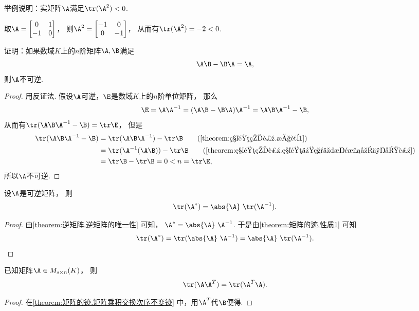 \begin{example}
举例说明：实矩阵\(\A\)满足\(\tr(\A^2)<0\).
\begin{solution}
取\(\A = \begin{bmatrix}
	0 & 1 \\
	-1 & 0
\end{bmatrix}\)，
则\(\A^2 = \begin{bmatrix}
	-1 & 0 \\
	0 & -1
\end{bmatrix}\)，
从而有\(\tr(\A^2) = -2 < 0\).
\end{solution}
\end{example}

\begin{example}
证明：如果数域\(K\)上的\(n\)阶矩阵\(\A,\B\)满足\[
	\A \B - \B \A=\A,
\]
则\(\A\)不可逆.
\begin{proof}
用反证法.
假设\(\A\)可逆，\(\E\)是数域\(K\)上的\(n\)阶单位矩阵，
那么\begin{gather*}
	\E = \A\A^{-1}
	= (\A \B - \B \A)\A^{-1} %
	= \A \B \A^{-1}-\B,
\end{gather*}
从而有\(\tr(\A \B \A^{-1}-\B) = \tr\E\)，
但是\begin{align*}
	\tr(\A \B \A^{-1}-\B)
	&= \tr(\A \B \A^{-1})-\tr\B
		\tag{\cref{theorem:矩阵的迹.性质1}} \\
	&= \tr(\A^{-1}(\A \B))-\tr\B
		\tag{\cref{theorem:矩阵的迹.矩阵乘积交换次序不变迹}} \\
	&= \tr\B-\tr\B
	= 0
	< n = \tr\E,
\end{align*}
所以\(\A\)不可逆.
\end{proof}
\end{example}

\begin{property}
设\(\A\)是可逆矩阵，
则\begin{equation}
	\tr(\A^*) = \abs{\A}~\tr(\A^{-1}).
\end{equation}
\begin{proof}
由\cref{theorem:逆矩阵.逆矩阵的唯一性} 可知，
\(\A^* = \abs{\A}~\A^{-1}\).
于是由\cref{theorem:矩阵的迹.性质1} 可知\[
	\tr(\A^*) = \tr(\abs{\A}~\A^{-1}) = \abs{\A}~\tr(\A^{-1}).
	\qedhere
\]
\end{proof}
\end{property}

\begin{property}
已知矩阵\(\A \in M_{s \times n}(K)\)，
则\begin{equation}
	\tr(\A\A^T) = \tr(\A^T\A).
\end{equation}
\begin{proof}
在\cref{theorem:矩阵的迹.矩阵乘积交换次序不变迹} 中，用\(\A^T\)代\(\B\)便得.
\end{proof}
\end{property}

